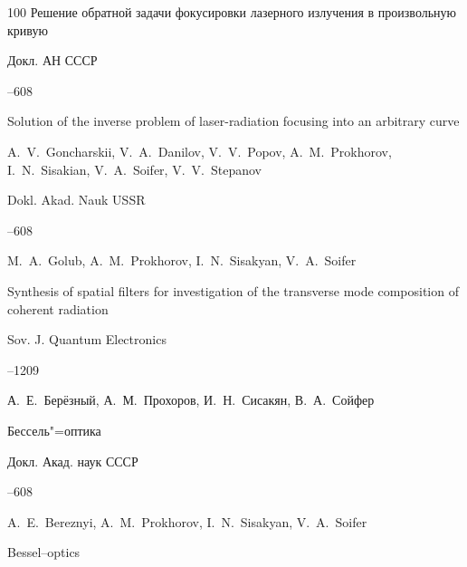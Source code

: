 \begin{thebibliography}{100}
\paper Решение обратной задачи фокусировки лазерного излучения в произвольную кривую

\jour Докл. АН СССР




--608


\misctransl

\paper Solution of the inverse problem of laser-radiation focusing into an arbitrary curve

\by A.~V.~Goncharskii,  V.~A.~Danilov,  V.~V.~Popov,  A.~M.~Prokhorov,  I.~N.~Sisakian, V.~A.~Soifer,  V.~V.~Stepanov

\jour Dokl. Akad. Nauk USSR




--608










\by M.~A.~Golub, A.~M.~Prokhorov, I.~N.~Sisakyan, V.~A.~Soifer

\paper Synthesis of spatial filters for investigation of the transverse mode composition of coherent radiation

\jour Sov. J. Quantum Electronics




--1209




\by А.~Е.~Берёзный, А.~М.~Прохоров, И.~Н.~Сисакян, В.~А.~Сойфер

\paper Бессель"=оптика

\jour Докл. Акад. наук СССР




--608

\misctransl

\by A.~E.~Bereznyi, A.~M.~Prokhorov, I.~N.~Sisakyan, V.~A.~Soifer

\paper Bessel--optics


\end{thebibliography}
